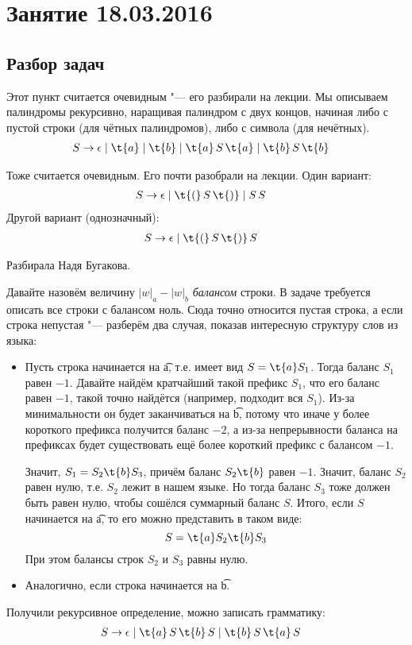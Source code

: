 \chapter{Занятие 18.03.2016}
\section{Разбор задач}

	Этот пункт считается очевидным "--- его разбирали на лекции.
	Мы описываем палиндромы рекурсивно, наращивая палиндром с двух концов, начиная либо с пустой
	строки (для чётных палиндромов), либо с символа (для нечётных).
	\begin{align*}
		S &\to \epsilon \mid \t{a} \mid \t{b} \mid \t{a}\,S\,\t{a} \mid \t{b}\,S\,\t{b}
	\end{align*}

	Тоже считается очевидным.
	Его почти разобрали на лекции.
	Один вариант:
	\begin{align*}
		S &\to \epsilon \mid \t{(}\,S\,\t{)} \mid S\,S
	\end{align*}
	Другой вариант (однозначный):
	\begin{align*}
		S &\to \epsilon \mid \t{(}\,S\,\t{)}\,S
	\end{align*}

	Разбирала Надя Бугакова.

	Давайте назовём величину $|w|_a-|w|_b$ \textit{балансом} строки.
	В задаче требуется описать все строки с балансом ноль.
	Сюда точно относится пустая строка, а если строка непустая "--- разберём два случая,
	показав интересную структуру слов из языка:
	\begin{itemize}
		\item
			Пусть строка начинается на \t{a}, т.е. имеет вид $S=\t{a}S_1$.
			Тогда баланс $S_1$ равен $-1$.
			Давайте найдём кратчайший такой префикс $S_1$, что его баланс равен $-1$,
			такой точно найдётся (например, подходит вся $S_1$).
			Из-за минимальности он будет заканчиваться на \t{b},
			потому что иначе у более короткого префикса получится баланс $-2$, а из-за
			непрерывности баланса на префиксах будет существовать ещё более короткий префикс с балансом $-1$.

			Значит, $S_1=S_2\t{b}S_3$, причём баланс $S_2\t{b}$ равен $-1$.
			Значит, баланс $S_2$ равен нулю, т.е. $S_2$ лежит в нашем языке.
			Но тогда баланс $S_3$ тоже должен быть равен нулю, чтобы сошёлся суммарный баланс $S$.
			Итого, если $S$ начинается на \t{a}, то его можно представить в таком виде:
			\[ S = \t{a}S_2\t{b}S_3 \]
			При этом балансы строк $S_2$ и $S_3$ равны нулю.
		\item
			Аналогично, если строка начинается на \t{b}.
	\end{itemize}
	Получили рекурсивное определение, можно записать грамматику:
	\begin{align*}
		S &\to \epsilon \mid \t{a}\,S\,\t{b}\,S \mid \t{b}\,S\,\t{a}\,S
	\end{align*}

